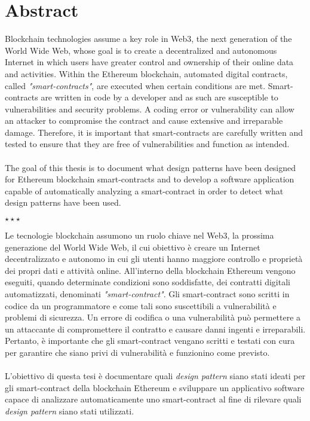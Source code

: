 \chapter*{Abstract}\label{abstract}
Blockchain technologies assume a key role in Web3, the next generation of the World Wide Web, whose goal is to create a decentralized and autonomous Internet in which users have greater control and ownership of their online data and activities. Within the Ethereum blockchain, automated digital contracts, called \textit{"smart-contracts"}, are executed when certain conditions are met. Smart-contracts are written in code by a developer and as such are susceptible to vulnerabilities and security problems. A coding error or vulnerability can allow an attacker to compromise the contract and cause extensive and irreparable damage. Therefore, it is important that smart-contracts are carefully written and tested to ensure that they are free of vulnerabilities and function as intended.\\
\\
The goal of this thesis is to document what design patterns have been designed for Ethereum blockchain smart-contracts and to develop a software application capable of automatically analyzing a smart-contract in order to detect what design patterns have been used.
\vspace{15pt}
\begin{center}
\large$\star\star\star$
\end{center}
\vspace{15pt}
Le tecnologie blockchain assumono un ruolo chiave nel Web3, la prossima generazione del World Wide Web, il cui obiettivo è creare un Internet decentralizzato e autonomo in cui gli utenti hanno maggiore controllo e proprietà dei propri dati e attività online. All'interno della blockchain Ethereum vengono eseguiti, quando determinate condizioni sono soddisfatte, dei contratti digitali automatizzati, denominati \textit{"smart-contract"}. Gli smart-contract sono scritti in codice da un programmatore e come tali sono suscettibili a vulnerabilità e problemi di sicurezza. Un errore di codifica o una vulnerabilità può permettere a un attaccante di compromettere il contratto e causare danni ingenti e irreparabili. Pertanto, è importante che gli smart-contract vengano scritti e testati con cura per garantire che siano privi di vulnerabilità e funzionino come previsto.\\
\\
L'obiettivo di questa tesi è documentare quali \textit{design pattern} siano stati ideati per gli smart-contract della blockchain Ethereum e sviluppare un applicativo software capace di analizzare automaticamente uno smart-contract al fine di rilevare quali \textit{design pattern} siano stati utilizzati.
 
